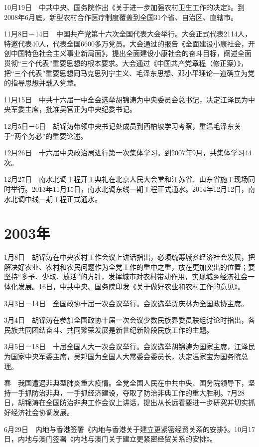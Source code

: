 \documentclass[10pt,a4paper,twocolumn]{book}
\begin{document}
10月19日　中共中央、国务院作出《关于进一步加强农村卫生工作的决定》。到2008年6月底，新型农村合作医疗制度覆盖到全国31个省、自治区、直辖市。

11月8日－14日　中国共产党第十六次全国代表大会举行。大会正式代表2114人，特邀代表40人，代表全国6600多万党员。大会通过的报告《全面建设小康社会，开创中国特色社会主义事业新局面》，提出全面建设小康社会的奋斗目标，阐述全面贯彻“三个代表”重要思想的根本要求。大会通过《中国共产党章程（修正案）》，把“三个代表”重要思想同马克思列宁主义、毛泽东思想、邓小平理论一道确立为党的指导思想并载入党章。

11月15日　中共十六届一中全会选举胡锦涛为中央委员会总书记，决定江泽民为中央军委主席，批准吴官正为中央纪委书记。

12月5日－6日　胡锦涛带领中央书记处成员到西柏坡学习考察，重温毛泽东关于“两个务必”的重要论述。

12月26日　十六届中央政治局进行第一次集体学习。到2007年9月，共集体学习44次。

12月27日　南水北调工程开工典礼在北京人民大会堂和江苏省、山东省施工现场同时举行。2013年11月15日，南水北调东线一期工程正式通水。2014年12月12日，南水北调中线一期工程正式通水。

\section{2003年}

1月8日　胡锦涛在中央农村工作会议上讲话指出，必须统筹城乡经济社会发展，把解决好农业、农村和农民问题作为全党工作的重中之重，放在更加突出的位置；要坚持“多予、少取、放活”的方针，发挥城市对农村带动作用，实现城乡经济社会一体化发展。16日，中共中央、国务院印发《关于做好农业和农村工作的意见》。

3月3日－14日　全国政协十届一次会议举行。会议选举贾庆林为全国政协主席。

3月4日　胡锦涛在参加全国政协十届一次会议少数民族界委员联组讨论时指出，各民族共同团结奋斗、共同繁荣发展是新世纪新阶段民族工作的主题。

3月5日－18日　十届全国人大一次会议举行。会议选举胡锦涛为国家主席，江泽民为国家中央军委主席，吴邦国为全国人大常委会委员长，决定温家宝为国务院总理。

春　我国遭遇非典型肺炎重大疫情。全党全国人民在中共中央、国务院领导下，坚持一手抓防治非典，一手抓经济建设，夺取了防治非典工作的重大胜利。7月28日，胡锦涛在全国防治非典工作会议上讲话，提出从长远看要进一步研究并切实抓好经济社会协调发展。

6月29日　内地与香港签署《内地与香港关于建立更紧密经贸关系的安排》。10月17日，内地与澳门签署《内地与澳门关于建立更紧密经贸关系的安排》。
\end{document}
